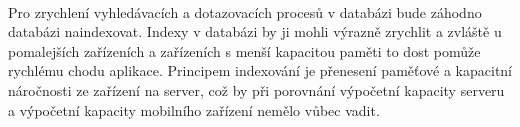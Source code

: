 \paragraph{}
Pro zrychlení vyhledávacích a dotazovacích procesů v databázi bude záhodno databázi naindexovat. Indexy v databázi by ji mohli výrazně zrychlit a zvláště u pomalejších zařízeních a zařízeních s menší kapacitou paměti to dost pomůže rychlému chodu aplikace. Principem indexování je přenesení paměťové a kapacitní náročnosti ze zařízení na server, což by při porovnání výpočetní kapacity serveru a výpočetní kapacity mobilního zařízení nemělo vůbec vadit. 